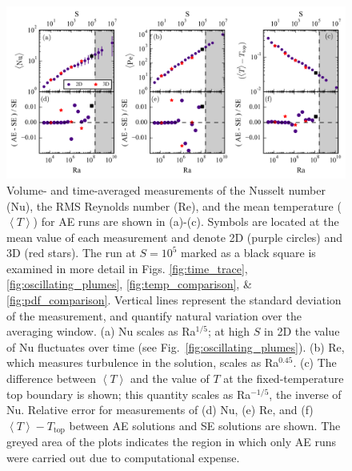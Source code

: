 \documentclass[aps, pre, onecolumn, nofootinbib, notitlepage, groupedaddress, amsfonts, amssymb, amsmath, longbibliography]{revtex4-1}
\newcommand{\angles}[1]{\ensuremath{\left\langle #1 \right\rangle}}
\begin{document}
\begin{figure}[t]
\vspace{-1.5cm}
\includegraphics[width=\textwidth]{./figs/parameter_space_comparison.png}
\caption{Volume- and time-averaged measurements of the Nusselt number (Nu), the
RMS Reynolds number (Re), and the mean temperature ($\angles{T}$) for AE runs are shown in (a)-(c).
Symbols are located at the mean value of
each measurement and denote 2D (purple circles) and 3D (red stars). 
The run at $S = 10^5$ marked as a
black square is examined in more detail in Figs. \ref{fig:time_trace}, \ref{fig:oscillating_plumes},
\ref{fig:temp_comparison}, \& \ref{fig:pdf_comparison}.
Vertical lines represent the standard deviation of the measurement,
and quantify natural variation over the averaging window. 
(a) Nu scales as Ra$^{1/5}$; at high $S$ in 2D the value of Nu fluctuates over time
(see Fig.~\ref{fig:oscillating_plumes}).  
(b) Re, which measures turbulence in the solution, scales as
Ra$^{0.45}$. (c) The difference between $\angles{T}$ and the value of $T$ at the fixed-temperature
top boundary is shown; this quantity scales as Ra$^{-1/5}$, the inverse of Nu.
Relative error for measurements of (d) Nu, (e) Re, and (f) $\angles{T} - T_{\text{top}}$ between 
AE solutions and SE solutions are shown.
The greyed area of the plots indicates the region in which only AE runs were
carried out due to computational expense. \label{fig:parameter_space_comparison} }
\end{figure}
\end{document}
